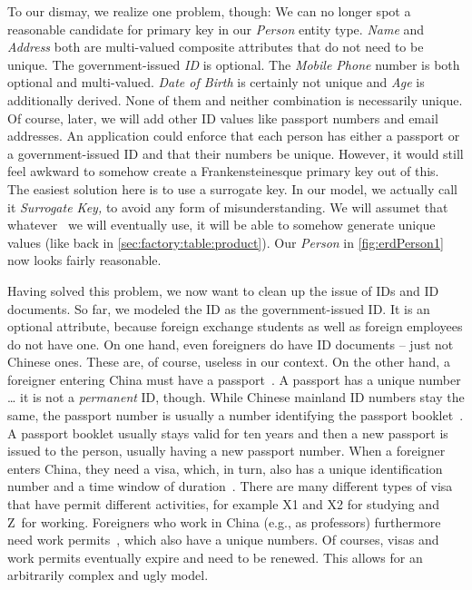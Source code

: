 To our dismay, we realize one problem, though:
We can no longer spot a reasonable candidate for primary key in our \emph{Person} entity type.
\emph{Name} and \emph{Address} both are multi-valued composite attributes that do not need to be unique.
The government-issued \emph{ID} is optional.
The \emph{Mobile Phone} number is both optional and multi-valued.
\emph{Date of Birth} is certainly not unique and \emph{Age} is additionally derived.
None of them and neither combination is necessarily unique.
Of course, later, we will add other ID values like passport numbers and email addresses.
An application could enforce that each person has either a passport or a government-issued ID and that their numbers be unique.
However, it would still feel awkward to somehow create a Frankensteinesque primary key out of this.
The easiest solution here is to use a surrogate key.
In our model, we actually call it \emph{Surrogate Key,} to avoid any form of misunderstanding.
We will assumet that whatever \dbms\ we will eventually use, it will be able to somehow generate unique values (like back in \cref{sec:factory:table:product}).
Our \emph{Person} in \cref{fig:erdPerson1} now looks fairly reasonable.

Having solved this problem, we now want to clean up the issue of IDs and ID documents.
So far, we modeled the ID as the government-issued ID.
It is an optional attribute, because foreign exchange students as well as foreign employees do not have one.
On one hand, even foreigners do have ID documents -- just not Chinese ones.
These are, of course, useless in our context.
On the other hand, a foreigner entering China must have a passport~\cite{ICAO2021MRTDP3SCTAMEE}.
A passport has a unique number {\dots} it is not a \emph{permanent} ID, though.
While Chinese mainland ID numbers stay the same, the passport number is usually a number identifying the passport booklet~\cite{ICAO2004TAGOMRTDFMUOPINAPN}.
A passport booklet usually stays valid for ten years and then a new passport is issued to the person, usually having a new passport number.
When a foreigner enters China, they need a visa, which, in turn, also has a unique identification number and a time window of duration~\cite{CMOFA2019ITCV}.
There are many different types of visa that have permit different activities, for example X1 and X2 for studying and Z~for working.
Foreigners who work in China (e.g., as professors) furthermore need work permits~\cite{BD2006BDBKWOFFITOROC}, which also have a unique numbers.
Of courses, visas and work permits eventually expire and need to be renewed.
This allows for an arbitrarily complex and ugly model.

